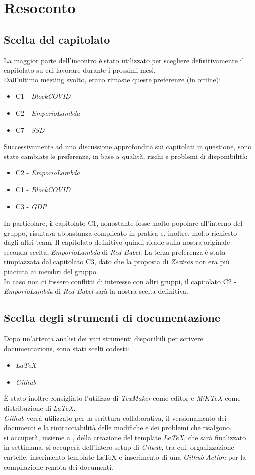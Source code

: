 \section{Resoconto}
\subsection{Scelta del capitolato}
La maggior parte dell'incontro è stato utilizzato per scegliere definitivamente il capitolato su cui lavorare durante i prossimi mesi.\\
Dall'ultimo meeting svolto, erano rimaste queste preferenze (in ordine):
\begin{itemize}
\item C1 - \textit{BlockCOVID}
\item C2 - \textit{EmporioLambda}
\item C7 - \textit{SSD}
\end{itemize}
Successivamente ad una discussione approfondita sui capitolati in questione, sono state cambiate le preferenze, in base a qualità, rischi e problemi di disponibilità:
\begin{itemize}
\item C2 - \textit{EmporioLambda}
\item C1 - \textit{BlockCOVID}
\item C3 - \textit{GDP}
\end{itemize}
In particolare, il capitolato C1, nonostante fosse molto popolare all'interno del gruppo, risultava abbastanza complicato in pratica e, inoltre, molto richiesto dagli altri team. Il capitolato definitivo quindi ricade sulla nostra originale seconda scelta, \textit{EmporioLambda} di \textit{Red Babel}. La terza preferenza è stata rimpiazzata dal capitolato C3, dato che la proposta di \textit{Zextras} non era più piaciuta ai membri del gruppo.\\
In caso non ci fossero conflitti di interesse con altri gruppi, il capitolato C2 - \textit{EmporioLambda} di \textit{Red Babel} sarà la nostra scelta definitiva.
\subsection{Scelta degli strumenti di documentazione}
Dopo un'attenta analisi dei vari strumenti disponibili per scrivere documentazione, sono stati scelti codesti:
\begin{itemize}
\item \textit{LaTeX} 
\item \textit{Github}
\end{itemize}
È stato inoltre consigliato l'utilizzo di \textit{TexMaker} come editor e \textit{MiKTeX} come distribuzione di \textit{LaTeX}.\\
\textit{Github} verrà utilizzato per la scrittura collaborativa, il versionamento dei documenti e la rintracciabilità delle modifiche e dei problemi che risalgono.\\
\SB{} si occuperà, insieme a \NM{}, della creazione del template \textit{LaTeX}, che sarà finalizzato in settimana.
\NM{} si occuperà dell'intero setup di \textit{Github}, tra cui: organizzazione cartelle, inserimento template LaTeX e inserimento di una \textit{Github Action} per la compilazione remota dei documenti.
